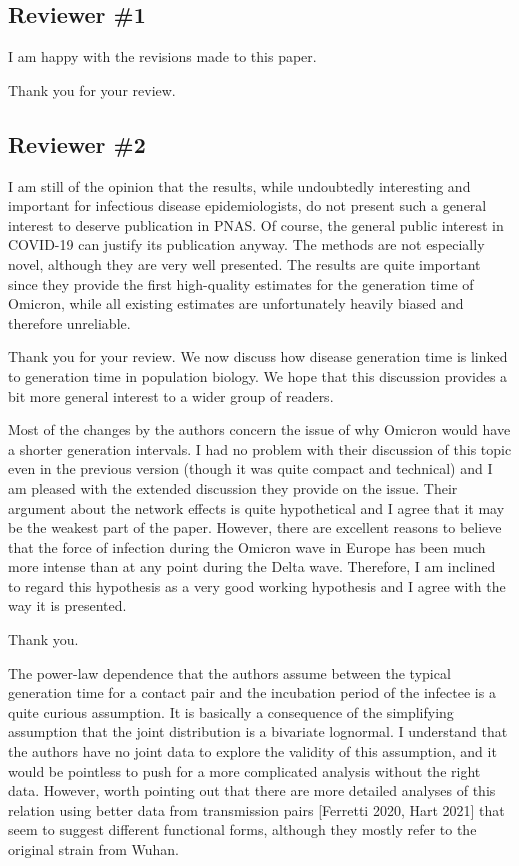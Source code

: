 \documentclass[12pt]{article}
\newcommand{\rev}{\subsection*}
\newcommand{\revtext}{\textsf}
\begin{document}
\rev{Reviewer \#1}

\revtext{I am happy with the revisions made to this paper.}

Thank you for your review.

\rev{Reviewer \#2}

\revtext{I am still of the opinion that the results, while undoubtedly interesting and important for infectious disease epidemiologists, do not present such a general interest to deserve publication in PNAS. Of course, the general public interest in COVID-19 can justify its publication anyway. The methods are not especially novel, although they are very well presented. The results are quite important since they provide the first high-quality estimates for the generation time of Omicron, while all existing estimates are unfortunately heavily biased and therefore unreliable.}

Thank you for your review. We now discuss how disease generation time is linked to generation time in population biology. We hope that this discussion provides a bit more general interest to a wider group of readers.

\revtext{Most of the changes by the authors concern the issue of why Omicron would have a shorter generation intervals. I had no problem with their discussion of this topic even in the previous version (though it was quite compact and technical) and I am pleased with the extended discussion they provide on the issue. Their argument about the network effects is quite hypothetical and I agree that it may be the weakest part of the paper. However, there are excellent reasons to believe that the force of infection during the Omicron wave in Europe has been much more intense than at any point during the Delta wave. Therefore, I am inclined to regard this hypothesis as a very good working hypothesis and I agree with the way it is presented.}

Thank you.

\revtext{The power-law dependence that the authors assume between the typical generation time for a contact pair and the incubation period of the infectee is a quite curious assumption. It is basically a consequence of the simplifying assumption that the joint distribution is a bivariate lognormal. I understand that the authors have no joint data to explore the validity of this assumption, and it would be pointless to push for a more complicated analysis without the right data. However, worth pointing out that there are more detailed analyses of this relation using better data from transmission pairs [Ferretti 2020, Hart 2021] that seem to suggest different functional forms, although they mostly refer to the original strain from Wuhan.}
\end{document}

